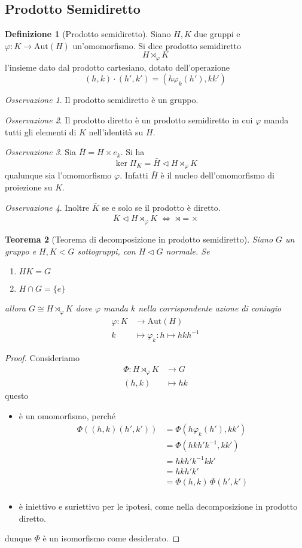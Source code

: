 \documentclass[a4paper]{article}
\newtheorem{theorem}{Teorema}[section]
\theoremstyle{remark}
\newtheorem*{remark}{Osservazione}
\theoremstyle{definition}
\newtheorem{definition}[theorem]{Definizione}
\newcommand{\Aut}[1]{\mathrm{Aut}\left( #1 \right)}
\newcommand{\fun}[5]{\begin{align*}
	#1 \colon #2 &\to #3 \\
	#4 &\mapsto #5
	\end{align*}}
\begin{document}
\subsection{Prodotto Semidiretto}
\begin{multicols}{2}
	\begin{definition}[Prodotto semidiretto]
		Siano $ H, K $ due gruppi e $ \varphi: K \rightarrow \Aut{H} $ un'omomorfismo. Si dice prodotto semidiretto
		\[ H \rtimes_\varphi K \]
		l'insieme dato dal prodotto cartesiano, dotato dell'operazione
		\[ (h, k) \cdot (h', k') = (h \varphi_k(h'), kk') \]
	\end{definition}

\begin{remark}
	Il prodotto semidiretto è un gruppo.
\end{remark}
\begin{remark}
	Il prodotto diretto è un prodotto semidiretto in cui $ \varphi $ manda tutti gli elementi di $ K $ nell'identità su $ H $.
\end{remark}
\begin{remark}
	Sia $ \bar{H} = H \times {e_k} $. Si ha $$  \ker\Pi_K =  \bar{H} \lhd H \rtimes_\varphi K  $$ qualunque sia l'omomorfismo $ \varphi$. Infatti $ \bar{H} $ è il nucleo dell'omomorfismo di proiezione su $ K $.
\end{remark}
\begin{remark}
	Inoltre $ \bar{K}$ se e solo se il prodotto è diretto. $$  \bar{K} \lhd H \rtimes_\varphi K  \;\Leftrightarrow\; \rtimes = \times $$
\end{remark}

\begin{theorem}[Teorema di decomposizione in prodotto semidiretto]
	Siano $ G $ un gruppo e $ H, K < G $ sottogruppi, con $ H \lhd G $ normale. Se \begin{enumerate}
		\item $ HK = G $
		\item $ H \cap G = \{e\} $
	\end{enumerate}
allora $ G \cong H \rtimes_\varphi K $ dove $ \varphi $ manda $ k $ nella corrispondente azione di coniugio \fun{\varphi}{K}{\Aut{H}}{k}{\varphi_k : h \mapsto hkh^{-1}}
\end{theorem}
\begin{proof}
	Consideriamo \fun{\Phi}{H \rtimes_\varphi K}{G}{(h, k)}{hk}
	questo
	\begin{itemize}
		\item è un omomorfismo, perché \begin{align*}
			\Phi((h, k)(h', k')) &= \Phi(h\varphi_k(h'), kk') \\
			&= \Phi(hkh'k^{-1}, kk') \\
			&= hkh'k^{-1}kk' \\
			&= hkh'k'\\
			&= \Phi(h, k)\,\Phi(h', k')\\
		\end{align*}
		\item è iniettivo e suriettivo per le ipotesi, come nella decomposizione in prodotto diretto.
	\end{itemize}
dunque $ \Phi $ è un isomorfismo come desiderato.
\end{proof}


\end{multicols}
\end{document}
